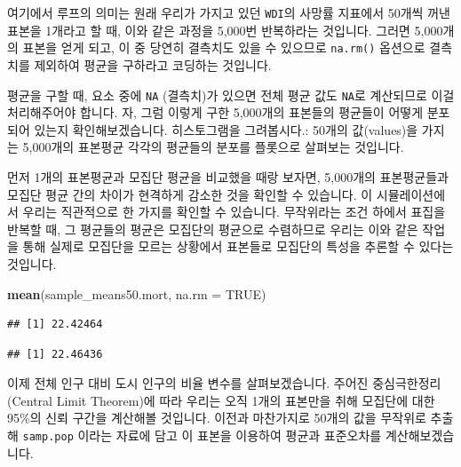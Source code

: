 \documentclass[]{book}
\newenvironment{Shaded}{\begin{snugshade}}{\end{snugshade}}
\newcommand{\DataTypeTok}[1]{\textcolor[rgb]{0.13,0.29,0.53}{#1}}
\newcommand{\KeywordTok}[1]{\textcolor[rgb]{0.13,0.29,0.53}{\textbf{#1}}}
\newcommand{\NormalTok}[1]{#1}
\newcommand{\OperatorTok}[1]{\textcolor[rgb]{0.81,0.36,0.00}{\textbf{#1}}}
\newcommand{\OtherTok}[1]{\textcolor[rgb]{0.56,0.35,0.01}{#1}}
\begin{document}
여기에서 루프의 의미는 원래 우리가 가지고 있던 \texttt{WDI}의 사망률 지표에서 50개씩 꺼낸 표본을 1개라고 할 때, 이와 같은 과정을 5,000번 반복하라는 것입니다. 그러면 5,000개의 표본을 얻게 되고, 이 중 당연히 결측치도 있을 수 있으므로 \texttt{na.rm()} 옵션으로 결측치를 제외하여 평균을 구하라고 코딩하는 것입니다.

평균을 구할 때, 요소 중에 \texttt{NA} (결측치)가 있으면 전체 평균 값도 \texttt{NA}로 계산되므로 이걸 처리해주어야 합니다. 자, 그럼 이렇게 구한 5,000개의 표본들의 평균들이 어떻게 분포되어 있는지 확인해보겠습니다. 히스토그램을 그려봅시다.: 50개의 값(values)을 가지는 5,000개의 표본평균 각각의 평균들의 분포를 플롯으로 살펴보는 것입니다.

먼저 1개의 표본평균과 모집단 평균을 비교했을 때랑 보자면, 5,000개의 표본평균들과 모집단 평균 간의 차이가 현격하게 감소한 것을 확인할 수 있습니다. 이 시뮬레이션에서 우리는 직관적으로 한 가지를 확인할 수 있습니다. 무작위라는 조건 하에서 표집을 반복할 때, 그 평균들의 평균은 모집단의 평균으로 수렴하므로 우리는 이와 같은 작업을 통해 실제로 모집단을 모르는 상황에서 표본들로 모집단의 특성을 추론할 수 있다는 것입니다.

\begin{Shaded}
\begin{Highlighting}[]
\KeywordTok{mean}\NormalTok{(sample_means50.mort, }\DataTypeTok{na.rm =} \OtherTok{TRUE}\NormalTok{)}
\end{Highlighting}
\end{Shaded}

\begin{verbatim}
## [1] 22.42464
\end{verbatim}

\begin{Shaded}
\end{Shaded}

\begin{verbatim}
## [1] 22.46436
\end{verbatim}

이제 전체 인구 대비 도시 인구의 비율 변수를 살펴보겠습니다. 주어진 중심극한정리 (Central Limit Theorem)에 따라 우리는 오직 1개의 표본만을 취해 모집단에 대한 95\%의 신뢰 구간을 계산해볼 것입니다. 이전과 마찬가지로 50개의 값을 무작위로 추출해 \texttt{samp.pop} 이라는 자료에 담고 이 표본을 이용하여 평균과 표준오차를 계산해보겠습니다.
\end{document}
